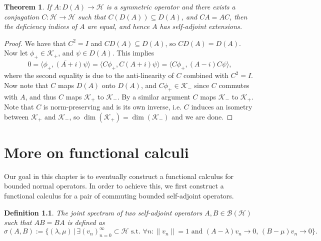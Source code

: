 \documentclass[12pt,oneside]{report}
\newtheorem{thm}{Theorem}[chapter]
\newtheorem{defn}[thm]{Definition}
\begin{document}
\begin{thm}
    If $A: D(A) \to \mathscr{H}$ is a symmetric operator and there exists a conjugation $C: \mathscr{H} \to \mathscr{H}$ such that $C(D(A)) \subseteq D(A)$, and $CA = AC$, then the deficiency indices of $A$ are equal, and hence $A$ has self-adjoint extensions.
\end{thm}
\begin{proof}
     We have that $C^{2} = I$ and $CD(A) \subseteq D(A)$, so $CD(A) = D(A)$. Now let $\phi_{+} \in \mathscr{K}_{+}$, and $\psi \in D(A)$. This implies $$0 = \overline{\langle \phi_{+}, (A + i) \psi \rangle} = \langle C\phi_{+}, C(A+i)\psi \rangle = \langle C\phi_{+}, (A-i)C\psi \rangle,$$ where the second equality is due to the anti-linearity of $C$ combined with $C^{2} = I$. Now note that $C$ maps $D(A)$ onto $D(A)$, and $C\phi_{+} \in \mathscr{K}_{-}$ since $C$ commutes with $A$, and thus $C$ maps $\mathscr{K}_{+}$ to $\mathscr{K}_{-}$. By a similar argument $C$ maps $\mathscr{K}_{-}$ to $\mathscr{K}_{+}$. Note that $C$ is norm-preserving and is its own inverse, i.e. $C$ induces an isometry between $\mathscr{K}_{+}$ and $\mathscr{K}_{-}$, so $\dim(\mathscr{K}_{+}) = \dim(\mathscr{K}_{-})$ and we are done.
\end{proof}

\chapter{More on functional calculi}

Our goal in this chapter is to eventually construct a functional calculus for bounded normal operators. In order to achieve this, we first construct a functional calculus for a pair of commuting bounded self-adjoint operators.

\begin{defn}
    The joint spectrum of two self-adjoint operators $A,B \in \mathscr{B}(\mathscr{H})$ such that $AB = BA$ is defined as $\sigma(A,B) := \{ (\lambda,\mu) \, | \, \exists (v_{n})_{n=0}^{\infty} \subset \mathscr{H} \text{ s.t. } \forall n: \|v_{n}\| = 1 \text{ and } (A - \lambda)v_{n} \to 0, \, (B - \mu)v_{n} \to 0 \}.$
\end{defn}
\end{document}
